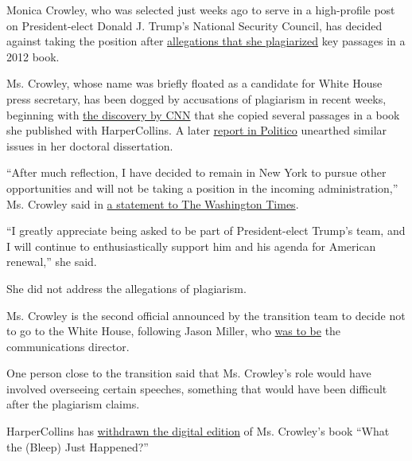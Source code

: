 Monica Crowley, who was selected just weeks ago to serve in a
high-profile post on President-elect Donald J. Trump's National Security
Council, has decided against taking the position after
\href{https://www.nytimes.com/2017/01/10/business/harpercollins-pulls-monica-crowley-book-for-plagiarism.html}{allegations
that she plagiarized} key passages in a 2012 book.

Ms. Crowley, whose name was briefly floated as a candidate for White
House press secretary, has been dogged by accusations of plagiarism in
recent weeks, beginning with
\href{http://money.cnn.com/interactive/news/kfile-trump-monica-crowley-plagiarized-multiple-sources-2012-book/?sr=fbmoney010717kfile-trump-monica-crowley-plagiarized-multiple-sources-2012-book0531PMStoryLink\&linkId=33126237\&sr=twCNN010717/?sr=fbmoney010717kfile}{the
discovery by CNN} that she copied several passages in a book she
published with HarperCollins. A later
\href{http://www.politico.com/magazine/story/2017/01/monica-crowley-plagiarism-phd-dissertation-columbia-214612}{report
in Politico} unearthed similar issues in her doctoral dissertation.

``After much reflection, I have decided to remain in New York to pursue
other opportunities and will not be taking a position in the incoming
administration,'' Ms. Crowley said in
\href{http://www.washingtontimes.com/news/2017/jan/16/crowley-forgo-post-trump-white-house/}{a
statement to The Washington Times}.

``I greatly appreciate being asked to be part of President-elect Trump's
team, and I will continue to enthusiastically support him and his agenda
for American renewal,'' she said.

She did not address the allegations of plagiarism.

Ms. Crowley is the second official announced by the transition team to
decide not to go to the White House, following Jason Miller, who
\href{https://www.nytimes.com/2016/12/24/us/politics/jason-miller-trump-white-house-communications-director.html}{was
to be} the communications director.

One person close to the transition said that Ms. Crowley's role would
have involved overseeing certain speeches, something that would have
been difficult after the plagiarism claims.

HarperCollins has
\href{https://www.nytimes.com/2017/01/10/business/harpercollins-pulls-monica-crowley-book-for-plagiarism.html}{withdrawn
the digital edition} of Ms. Crowley's book ``What the (Bleep) Just
Happened?''

